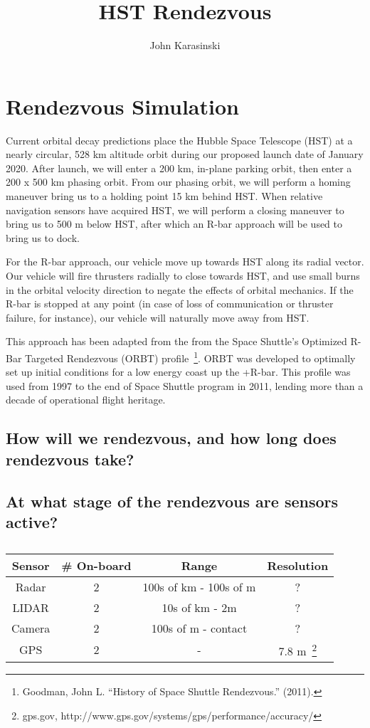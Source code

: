 \documentclass[onecolumn,10pt]{jhwhw}
\author{John Karasinski}
\title{HST Rendezvous}
\begin{document}

\chapter{Rendezvous Simulation}

Current orbital decay predictions place the Hubble Space Telescope (HST) at a nearly circular, 528 km altitude orbit during our proposed launch date of January 2020. After launch, we will enter a 200 km, in-plane parking orbit, then enter a 200 x 500 km phasing orbit. From our phasing orbit, we will perform a homing maneuver bring us to a holding point 15 km behind HST. When relative navigation sensors have acquired HST, we will perform a closing maneuver to bring us to 500 m below HST, after which an R-bar approach will be used to bring us to dock.

For the R-bar approach, our vehicle move up towards HST along its radial vector. Our vehicle will fire thrusters radially to close towards HST, and use small burns in the orbital velocity direction to negate the effects of orbital mechanics. If the R-bar is stopped at any point (in case of loss of communication or thruster failure, for instance), our vehicle will naturally move away from HST.

This approach has been adapted from the from the Space Shuttle's Optimized R-Bar Targeted Rendezvous (ORBT) profile~\footnote{Goodman, John L. ``History of Space Shuttle Rendezvous.'' (2011).}. ORBT was developed to optimally set up initial conditions for a low energy coast up the +R-bar. This profile was used from 1997 to the end of Space Shuttle program in 2011, lending more than a decade of operational flight heritage.

\section{How will we rendezvous, and how long does rendezvous take?}
\section{At what stage of the rendezvous are sensors active?}

\begin{table}[t!]
\begin{center}
\begin{tabular}{c c c c}
\toprule
Sensor & \# On-board & Range & Resolution \\
\midrule
Radar        & 2 & 100s of km - 100s of m & ? \\
LIDAR        & 2 & 10s of km - 2m & ? \\
Camera       & 2 & 100s of m - contact & ? \\
GPS          & 2 & - & 7.8 m~\footnote{gps.gov, http://www.gps.gov/systems/gps/performance/accuracy/} \\
\bottomrule
\end{tabular}
\end{center}
\caption{}
\end{table}
\end{document}
